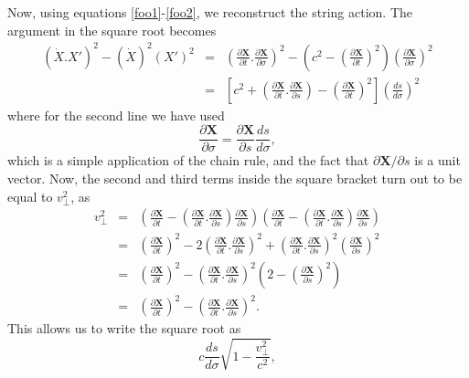 \documentclass[a4paper,12pt]{article}
\numberwithin{equation}{section}
\begin{document}
Now, using equations \ref{foo1}-\ref{foo2}, we reconstruct the string action.
The argument in the square root becomes
\begin{eqnarray*}
(\dot{X}.X')^2 - (\dot{X})^2(X')^2& = &\left(\frac{\partial \mathbf{X}}{\partial t}.\frac{\partial \mathbf{X}}{\partial \sigma}\right)^2 - \left(c^2-\left(\frac{\partial \mathbf{X}}{\partial t}\right)^2\right)\left(\frac{\partial \mathbf{X}}{\partial \sigma}\right)^2 \\
& = & \left[ c^2 + \left(\frac{\partial \mathbf{X}}{\partial t}.\frac{\partial \mathbf{X}}{\partial s}\right) -\left(\frac{\partial \mathbf{X}}{\partial t}\right)^2\right]\left(\frac{ds}{d\sigma}\right)^2
\end{eqnarray*}
where for the second line we have used  
\begin{equation}
\frac{\partial \mathbf{X}}{\partial \sigma} = \frac{\partial \mathbf{X}}{\partial s} \frac{ds}{d\sigma},
\end{equation}
which is a simple application of the chain rule, and the fact that $\partial \mathbf{X}/\partial s$ is a unit vector.
Now, the second and third terms inside the square bracket turn out to be equal to $v_\perp^2$, as
\begin{eqnarray*}
v_\perp^2& =& \left(\frac{\partial \mathbf{X}}{\partial t} - \left(\frac{\partial \mathbf{X}}{\partial t}.\frac{\partial \mathbf{X}}{\partial s}\right) \frac{\partial \mathbf{X}}{\partial s}\right)\left(\frac{\partial \mathbf{X}}{\partial t} - \left(\frac{\partial \mathbf{X}}{\partial t}.\frac{\partial \mathbf{X}}{\partial s}\right) \frac{\partial \mathbf{X}}{\partial s}\right) \\ 
& = & \left(\frac{\partial \mathbf{X}}{\partial t}\right)^2 - 2\left(\frac{\partial \mathbf{X}}{\partial t}.\frac{\partial \mathbf{X}}{\partial s}\right)^2 + \left(\frac{\partial \mathbf{X}}{\partial t}.\frac{\partial \mathbf{X}}{\partial s}\right)^2\left(\frac{\partial \mathbf{X}}{\partial s} \right)^2 \\
& = &  \left(\frac{\partial \mathbf{X}}{\partial t}\right)^2 -\left(\frac{\partial \mathbf{X}}{\partial t}.\frac{\partial \mathbf{X}}{\partial s}\right)^2 \left(2 - \left(\frac{\partial \mathbf{X}}{\partial s} \right)^2\right) \\
& = &  \left(\frac{\partial \mathbf{X}}{\partial t}\right)^2 -\left(\frac{\partial \mathbf{X}}{\partial t}.\frac{\partial \mathbf{X}}{\partial s}\right)^2. 
\end{eqnarray*}
This allows us to write the square root as
\begin{equation}
c\frac{ds}{d\sigma}\sqrt{1-\frac{v_\perp^2}{c^2}},
\end{equation}
\end{document}
